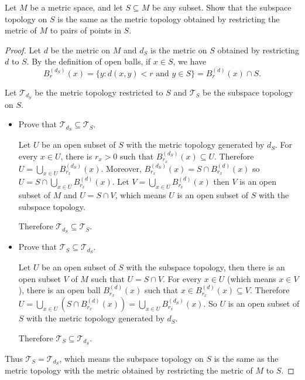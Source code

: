 \begin{exercise}{3.3}
	Let $M$ be a metric space, and let $S\subseteq M$ be any subset. Show that the subspace topology on $S$ is the same as the metric topology obtained by restricting the metric of $M$ to pairs of points in $S$.
\end{exercise}

\begin{proof}
	Let $d$ be the metric on $M$ and $d_{S}$ is the metric on $S$ obtained by restricting $d$ to $S$. By the definition of open balls, if $x\in S$, we have
	\[
		B^{(d_{S})}_{r}(x) = \{ y : d(x, y) < r \text{ and } y\in S \} = B^{(d)}_{r}(x) \cap S.
	\]

	Let $\mathscr{T}_{d_{S}}$ be the metric topology restricted to $S$ and $\mathscr{T}_{S}$ be the subspace topology on $S$.

	\begin{itemize}
		\item Prove that $\mathscr{T}_{d_{S}}\subseteq \mathscr{T}_{S}$.

		      Let $U$ be an open subset of $S$ with the metric topology generated by $d_{S}$. For every $x\in U$, there is $r_{x} > 0$ such that $B^{(d_{S})}_{r_{x}}(x)\subseteq U$. Therefore $U = \bigcup_{x\in U}B^{(d_{S})}_{r_{x}}(x)$. Moreover, $B^{(d_{S})}_{r_{x}}(x) = S\cap B^{(d)}_{r_{x}}(x)$ so $U = S\cap \bigcup_{x\in U}B^{(d)}_{r_{x}}(x)$. Let $V = \bigcup_{x\in U}B^{(d)}_{r_{x}}(x)$ then $V$ is an open subset of $M$ and $U = S\cap V$, which means $U$ is an open subset of $S$ with the subspace topology.

		      Therefore $\mathscr{T}_{d_{S}}\subseteq \mathscr{T}_{S}$.

		\item Prove that $\mathscr{T}_{S}\subseteq \mathscr{T}_{d_{S}}$.

		      Let $U$ be an open subset of $S$ with the subspace topology, then there is an open subset $V$ of $M$ such that $U = S\cap V$. For every $x\in U$ (which means $x\in V$), there is an open ball $B^{(d)}_{r_{x}}(x)$ such that $x\in B^{(d)}_{r_{x}}(x)\subseteq V$. Therefore $U = \bigcup_{x\in U}(S\cap B^{(d)}_{r_{x}}(x)) = \bigcup_{x\in U}B^{(d_{S})}_{r_{x}}(x)$. So $U$ is an open subset of $S$ with the metric topology generated by $d_{S}$.

		      Therefore $\mathscr{T}_{S}\subseteq\mathscr{T}_{d_{S}}$.
	\end{itemize}

	Thus $\mathscr{T}_{S} = \mathscr{T}_{d_{S}}$, which means the subspace topology on $S$ is the same as the metric topology with the metric obtained by restricting the metric of $M$ to $S$.
\end{proof}

